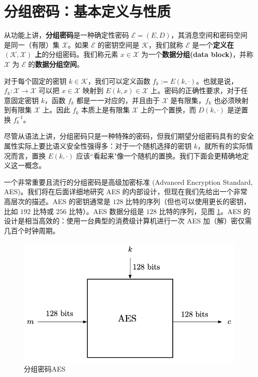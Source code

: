 \section{分组密码：基本定义与性质}

从功能上讲，\textbf{分组密码}是一种确定性密码 $\mathcal{E}=(E,D)$，其消息空间和密码空间是同一（有限）集 $\mathcal{X}$。如果 $\mathcal{E}$ 的密钥空间是 $\mathcal{K}$，我们就称 $\mathcal{E}$ 是一个\textbf{定义在 $(\mathcal{K},\mathcal{X})$ 上}的分组密码。我们称元素 $x\in\mathcal{X}$ 为一个\textbf{数据分组(data block)}，并称 $\mathcal{X}$ 为 $\mathcal{E}$ 的\textbf{数据分组空间}。

对于每个固定的密钥 $k\in\mathcal{K}$，我们可以定义函数 $f_k:=E(k,\cdot)$。也就是说，$f_k:\mathcal{X}\to\mathcal{X}$ 可以把 $x\in\mathcal{X}$ 映射到 $E(k,x)\in\mathcal{X}$ 上。密码的正确性要求，对于任意固定密钥 $k$，函数 $f_k$ 都是一一对应的，并且由于 $\mathcal{X}$ 是有限集，$f_k$ 也必须映射到有限集 $\mathcal{X}$ 上。因此 $f_k$ 本质上是有限集 $\mathcal{X}$ 上的一个置换，而 $D(k,\cdot)$ 是逆置换 $f^{-1}_k$。

尽管从语法上讲，分组密码只是一种特殊的密码，但我们期望分组密码具有的安全属性实际上要比语义安全性强得多：对于一个随机选择的密钥 $k$，就所有的实际情况而言，置换 $E(k,\cdot)$ 应该``看起来"像一个随机的置换。我们下面会更精确地定义这一概念。

一个非常重要且流行的分组密码是高级加密标准 (Advanced Encryption Standard, AES)。我们将在后面详细地研究 AES 的内部设计，但现在我们先给出一个非常高层次的描述。AES 的密钥通常是 $128$ 比特的序列（但也可以使用更长的密钥，比如 $192$ 比特或 $256$ 比特）。AES 数据分组是 $128$ 比特的序列，见图 \ref{fig:4-1}。AES 的设计是相当高效的：使用一台典型的消费级计算机进行一次 AES 加（解）密仅需几百个时钟周期。

\begin{figure}
  \centering
  \includegraphics[width=0.5\linewidth]{figures/chapter4/fig1.png}
  \caption{分组密码AES}
  \label{fig:4-1}
\end{figure}

